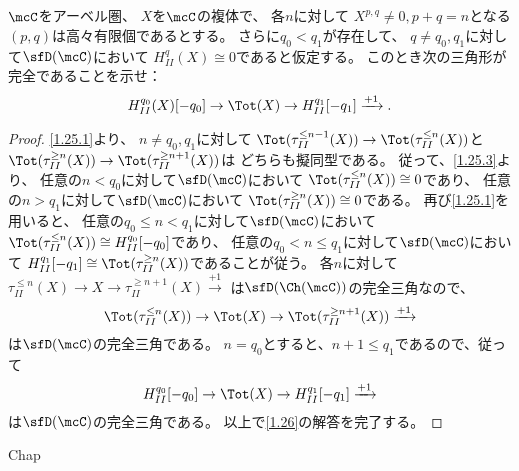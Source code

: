\documentclass[uplatex,dvipdfmx]{jsarticle}
\begin{document}
\maketitle\HeaderCommentA
\section{}
\fi



\begin{prob}\label{1.26}
  \(\mcC\)をアーベル圏、
  \(X\)を\(\mcC\)の複体で、
  各\(n\)に対して
  \(X^{p,q}\neq 0, p+q=n\)となる\((p,q)\)は高々有限個であるとする。
  さらに\(q_0 < q_1\)が存在して、
  \(q\neq q_0,q_1\)に対して\(\sfD(\mcC)\)において
  \(H_{II}^q(X) \cong 0\)であると仮定する。
  このとき次の三角形が完全であることを示せ：
  \[
  H_{II}^{q_0}(X)[-q_0] \to \Tot(X) \to H_{II}^{q_1}[-q_1]
  \xrightarrow{+1}.
  \]
\end{prob}

\begin{proof}
  \autoref{1.25.1}より、
  \(n\neq q_0,q_1\)に対して
  \(\Tot(\tau_{II}^{\leq n-1}(X)) \to \Tot(\tau_{II}^{\leq n}(X))\)と
  \(\Tot(\tau_{II}^{\geq n}(X)) \to \Tot(\tau_{II}^{\geq n+1}(X))\)は
  どちらも擬同型である。
  従って、\autoref{1.25.3}より、
  任意の\(n < q_0\)に対して\(\sfD(\mcC)\)において
  \(\Tot(\tau_{II}^{\leq n}(X)) \cong 0\)であり、
  任意の\(n > q_1\)に対して\(\sfD(\mcC)\)において
  \(\Tot(\tau_{II}^{\geq n}(X)) \cong 0\)である。
  再び\autoref{1.25.1}を用いると、
  任意の\(q_0 \leq n < q_1\)に対して\(\sfD(\mcC)\)において
  \(\Tot(\tau_{II}^{\leq n}(X)) \cong H_{II}^{q_0}[-q_0]\)であり、
  任意の\(q_0 < n \leq q_1\)に対して\(\sfD(\mcC)\)において
  \(H_{II}^{q_1}[-q_1] \cong \Tot(\tau_{II}^{\geq n}(X))\)であることが従う。
  各\(n\)に対して
  \(\tau_{II}^{\leq n}(X) \to X \to \tau_{II}^{\geq n+1}(X)\xrightarrow{+1}\)
  は\(\sfD(\Ch(\mcC))\)の完全三角なので、
  \[
  \Tot(\tau_{II}^{\leq n}(X)) \to \Tot(X)
  \to \Tot(\tau_{II}^{\geq n+1}(X)) \xrightarrow{+1}
  \]
  は\(\sfD(\mcC)\)の完全三角である。
  \(n=q_0\)とすると、\(n+1\leq q_1\)であるので、従って
  \[
  H_{II}^{q_0}[-q_0] \to \Tot(X) \to H_{II}^{q_1}[-q_1] \xrightarrow{+1}
  \]
  は\(\sfD(\mcC)\)の完全三角である。
  以上で\autoref{1.26}の解答を完了する。
\end{proof}



\ifcsname Chap\endcsname\else
\printbibliography
\end{document}

